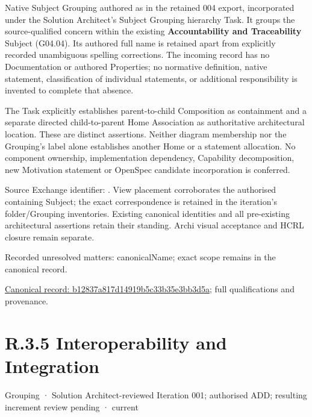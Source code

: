 Native Subject Grouping authored as \texttt{} in the retained 004 export,
incorporated under the Solution Architect's Subject Grouping hierarchy Task.
It groups the source-qualified \texttt{} concern within
the existing \textbf{Accountability and Traceability} Subject (G04.04). Its authored full name
is retained apart from explicitly recorded unambiguous spelling corrections.
The incoming record has no Documentation or authored Properties; no normative
definition, native statement, classification of individual statements, or
additional responsibility is invented to complete that absence.



The Task explicitly establishes parent-to-child Composition as containment and
a separate directed child-to-parent Home Association as authoritative architectural
location. These are distinct assertions. Neither diagram membership nor the
Grouping's label alone establishes another Home or a statement allocation.
No component ownership, implementation dependency, Capability decomposition,
new Motivation statement or OpenSpec candidate incorporation is conferred.



Source Exchange identifier: \texttt{}. View placement corroborates
the authorised containing Subject; the exact correspondence is retained in the
iteration's folder/Grouping inventories. Existing canonical identities and all
pre-existing architectural assertions retain their standing. Archi visual
acceptance and HCRL closure remain separate.


{\small Recorded unresolved matters: canonicalName; exact scope remains in the canonical record.}\par
{\footnotesize \href{../../../../continuum/grouping/b12837a817d14919b5c33b35e3bb3d5a.md}{Canonical record: b12837a817d14919b5c33b35e3bb3d5a}; full qualifications and provenance.}\par
\section*{R.3.5 Interoperability and Integration}
\label{navigation:R.3.5}

\label{element:098d2e468cd14029b43ec6dbd07374fd}
{\small Grouping · Solution Architect-reviewed Iteration 001; authorised ADD; resulting increment review pending · current}\par

